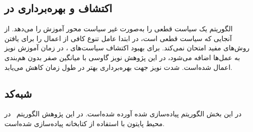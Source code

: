          \subsection{اکتشاف و بهره‌برداری در 
 }
 الگوریتم
  یک سیاست قطعی را به‌صورت غیر سیاست محور آموزش را می‌دهد. از آنجایی که سیاست قطعی است،
در ابتدا عامل تنوع کافی از اعمال را برای یافتن روش‌های مفید امتحان نمی‌کند. برای بهبود اکتشاف سیاست‌های ،
در زمان آموزش
 نویز به عمل‌ها اضافه می‌شود، در این پژوهش نویز گاوسی با میانگین صفر بدون هم‌بندی اعمال شده‌است.
 شدت نویز جهت بهره‌برداری بهتر در طول زمان کاهش می‌یابد.
  
  \subsection{شبه‌کد 
  }
   در این بخش الگوریتم
  پیاده‌سازی شده آورده شده‌است. در این پژوهش الگوریتم~ در محیط پایتون با استفاده از کتابخانه
   \cite{paszke2017automatic}
  پیاده‌سازی شده‌‌است.
         

